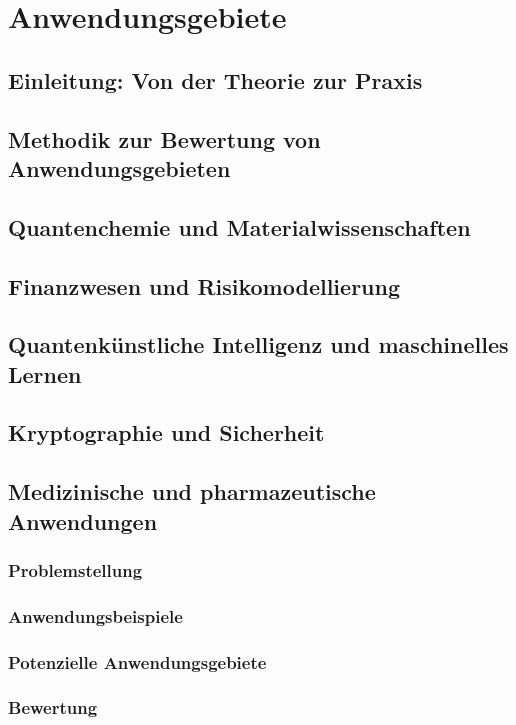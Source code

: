 \chapter{Anwendungsgebiete}
\label{applications} %



\section{Einleitung: Von der Theorie zur Praxis}


\section{Methodik zur Bewertung von Anwendungsgebieten}


\section{Quantenchemie und Materialwissenschaften}


\section{Finanzwesen und Risikomodellierung}


\section{Quantenkünstliche Intelligenz und maschinelles Lernen}


\section{Kryptographie und Sicherheit}


\section{Medizinische und pharmazeutische Anwendungen}

\subsection{Problemstellung}

\subsection{Anwendungsbeispiele}

\subsection{Potenzielle Anwendungsgebiete} %

\subsection{Bewertung}

\printbibliography
